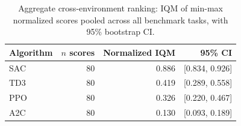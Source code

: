 \begin{table}[t]
\centering
\footnotesize
\caption{Aggregate cross-environment ranking: IQM of min-max normalized scores pooled across all benchmark tasks, with 95\% bootstrap CI.}
\label{tab:aggregate}
\begin{tabular}{lrrr}
\toprule
Algorithm & $n$ scores & Normalized IQM & 95\% CI \\
\midrule
SAC & 80 & 0.886 & [0.834, 0.926] \\
TD3 & 80 & 0.419 & [0.289, 0.558] \\
PPO & 80 & 0.326 & [0.220, 0.467] \\
A2C & 80 & 0.130 & [0.093, 0.189] \\
\bottomrule
\end{tabular}
\end{table}